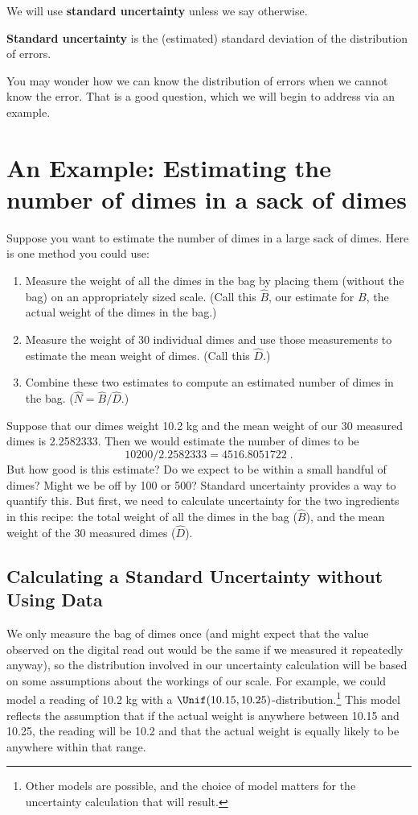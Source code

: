 \documentclass[twoside]{book}\usepackage[]{graphicx}\usepackage[]{xcolor}
\def\term#1{\textbf{#1}}
\newlength{\tempfmlength}
\newenvironment{fmpage}[1]
     {
	 \medskip
	 \setlength{\tempfmlength}{#1}
	 \begin{lrbox}{\fmbox}
	   \begin{minipage}{#1}
		 \vspace*{.02\tempfmlength}
		 \hfill
	   \begin{minipage}{.95 \tempfmlength}}
		 {\end{minipage}\hfill
		 \vspace*{.015\tempfmlength}
		 \end{minipage}\end{lrbox}\fbox{\usebox{\fmbox}}
	 \medskip
	 }
\newenvironment{boxedText}[1][.98\textwidth]%
{%
\begin{center}
\begin{fmpage}{#1}
}%
{%
\end{fmpage}
\end{center}
}
\newcounter{example}[section]
\begin{document}
We will use \term{standard uncertainty} unless we say otherwise.
\begin{boxedText}
	\term{Standard uncertainty} is the (estimated) standard deviation of 
	the distribution of errors.
\end{boxedText}
You may wonder how we can know the distribution of errors when we cannot know the error.
That is a good question, which we will begin to address via an example.

\section{An Example: Estimating the number of dimes in a sack of dimes}


Suppose you want to estimate the number of dimes in a large sack of dimes.  Here is one method
you could use:

\begin{enumerate}
	\item Measure the weight of all the dimes in the bag by placing them (without the bag)
		on an appropriately sized scale.  (Call this $\hat B$, our estimate for $B$,
		the actual weight of the dimes in the bag.)
	\item
		Measure the weight of 30 individual dimes and use those measurements to
		estimate the mean weight of dimes. (Call this $\hat D$.)
	\item
		Combine these two estimates to compute an estimated number of dimes in the bag.
		($\hat N = \hat B / \hat D$.)
\end{enumerate}

Suppose that our dimes weight 10.2 kg and the mean weight of our 30 measured dimes is
2.2582333.  Then we would estimate the number of dimes to be 
\[
10200 / 2.2582333 = 4516.8051722 \;.
\]
But how good is this estimate?  Do we expect to be within a small handful of dimes?  Might we be 
off by 100 or 500?  Standard uncertainty provides a way to quantify this.  But first, 
we need to calculate uncertainty for the two ingredients in this recipe: 
the total weight of all the dimes in the bag ($\hat B$), and the mean weight of the 
30 measured dimes ($\hat D$).

\subsection{Calculating a Standard Uncertainty without Using Data}

We only measure the bag of dimes once (and might expect that the value
observed on the digital read out would be the same if we measured it repeatedly
anyway), so the distribution involved in our uncertainty calculation will be 
based on some assumptions about the workings of our scale.  For example, we could
model a reading of 10.2 kg with
a $\Unif(10.15, 10.25)$-distribution.\footnote{Other models are possible, and the choice of 
model matters for the uncertainty calculation that will result.}  
This model reflects the assumption that if the actual weight is anywhere between 10.15 and 10.25,
the reading will be 10.2 and that the actual weight is equally likely to be anywhere within
that range.
\end{document}
